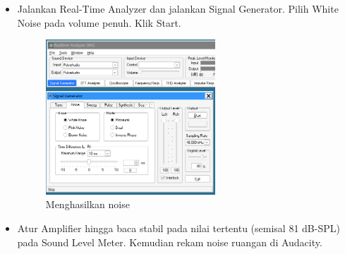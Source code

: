 \documentclass{article}
\begin{document}
\begin{itemize}
		\item Jalankan Real-Time Analyzer dan jalankan Signal Generator.
		Pilih White Noise pada volume penuh. Klik Start.
		
		\begin{figure}[H]
			\centering
			\includegraphics[width=0.6\textwidth,angle=0]{images/rta_noise_gen}
			\caption{Menghasilkan noise}
		\end{figure}
		
		\item Atur Amplifier hingga baca stabil pada nilai tertentu (semisal 81 dB-SPL) pada Sound Level Meter.
		Kemudian rekam noise ruangan di Audacity.
		

\end{itemize}
\end{document}
